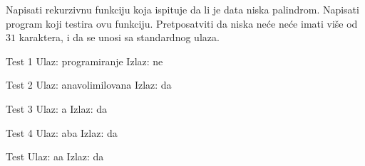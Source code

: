 \begin{Exercise}[label=113]
Napisati rekurzivnu funkciju koja ispituje da li je data niska
  palindrom. Napisati program koji testira ovu funkciju. Pretposatviti
  da niska neće neće imati više od $31$ karaktera, i da se unosi sa standardnog
  ulaza.
  
\begin{miditest}
\begin{test}{Test 1}
Ulaz:    programiranje    
Izlaz:   ne                   
\end{test}
\end{miditest}
\begin{miditest}
\begin{test}{Test 2}
Ulaz:    anavolimilovana 
Izlaz:   da                   
\end{test}
\end{miditest}

\begin{minitest}
\begin{test}{Test 3}
Ulaz:    a        
Izlaz:   da 
\end{test}
\end{minitest}
\begin{minitest}
\begin{test}{Test 4}
Ulaz:    aba   
Izlaz:   da 
\end{test}
\end{minitest}
\begin{minitest}
\begin{test}{Test }
Ulaz:    aa
Izlaz:   da 
\end{test}
\end{minitest}
\end{Exercise}
\begin{Answer}[ref=113]
\end{Answer}



